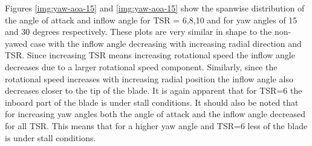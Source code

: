 Figures \ref{img:yaw-aoa-15} and \ref{img:yaw-aoa-15} show the spanwise distribution of the angle of attack and inflow angle for TSR = 6,8,10 and for yaw angles of 15 and 30 degrees respectively. These plots are very similar in shape to the non-yawed case with the inflow angle decreasing with increasing radial direction and TSR. Since increasing TSR means increasing rotational speed the inflow angle decreases due to a larger rotational speed component. Similarly, since the rotational speed increases with increasing radial position the inflow angle also decreases closer to the tip of the blade.
It is again apparent that for TSR=6 the inboard part of the blade is under stall conditions. It should also be noted that for increasing yaw angles both the angle of attack and the inflow angle decreased for all TSR. This means that for a higher yaw angle and TSR=6 less of the blade is under stall conditions.

